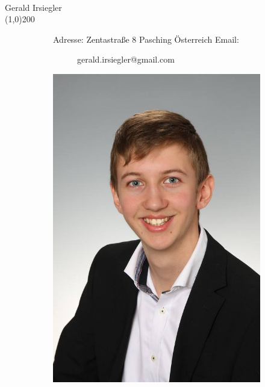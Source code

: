 \documentclass[FIPLY_base.tex]{subfiles}
\begin{document}
	\ \\
	{\Large Gerald Irsiegler}
	\ \\
	\line(1,0){200}
	\begin{figure}[H]
		\begin{subfigure}[b]{0.3\textwidth}
			Adresse: \newline
			Zentastraße 8  Pasching \newline
			Österreich \newline
			\newline
			Email:
			\begin{subfigure}[b]{0.2\textwidth}
				gerald.irsiegler@gmail.com
			\end{subfigure}
			\newline
			\newline
			\newline
			\newline
			\newline
		\end{subfigure}
		\hfil
		\begin{subfigure}[b]{0.2\textwidth}
			\includegraphics[scale=0.2]{img/gary}
		\end{subfigure}
	\end{figure}
\end{document}
